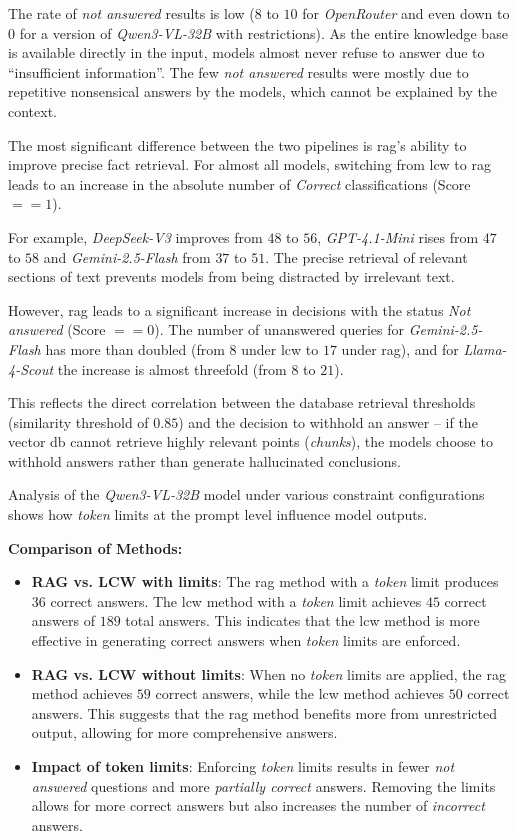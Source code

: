 The rate of \textit{not answered} results is low ($8$ to $10$ for \textit{OpenRouter} and even down to $0$ for a version of \textit{Qwen3-VL-32B} with restrictions).
As the entire knowledge base is available directly in the input, models almost never refuse to answer due to \enquote{insufficient information}.
The few \textit{not answered} results were mostly due to repetitive nonsensical answers by the models, which cannot be explained by the context.

The most significant difference between the two pipelines is \ac{rag}'s ability to improve precise fact retrieval.
For almost all models, switching from \ac{lcw} to \ac{rag} leads to an increase in the absolute number of \textit{Correct} classifications (Score $== 1$).

For example, \textit{DeepSeek-V3} improves from $48$ to $56$, \textit{GPT-4.1-Mini} rises from $47$ to $58$ and \textit{Gemini-2.5-Flash} from $37$ to $51$.
The precise retrieval of relevant sections of text prevents models from being distracted by irrelevant text.

However, \ac{rag} leads to a significant increase in decisions with the status \textit{Not answered} (Score $== 0$).
The number of unanswered queries for \textit{Gemini-2.5-Flash} has more than doubled (from $8$ under \ac{lcw} to $17$ under \ac{rag}), and for \textit{Llama-4-Scout} the increase is almost threefold (from $8$ to $21$).

This reflects the direct correlation between the database retrieval thresholds (similarity threshold of $0.85$) and the decision to withhold an answer -- if the vector \ac{db} cannot retrieve highly relevant points (\textit{chunks}), the models choose to withhold answers rather than generate hallucinated conclusions.

Analysis of the \textit{Qwen3-VL-32B} model under various constraint configurations shows how \textit{token} limits at the prompt level influence model outputs.

\noindent\textbf{Comparison of Methods:}
\begin{itemize}
    \item \textbf{RAG vs. LCW with limits}: The \ac{rag} method with a \textit{token} limit produces $36$ correct answers.
    The \ac{lcw} method with a \textit{token} limit achieves $45$ correct answers of $189$ total answers.
    This indicates that the \ac{lcw} method is more effective in generating correct answers when \textit{token} limits are enforced.
    \item \textbf{RAG vs. LCW without limits}: When no \textit{token} limits are applied, the \ac{rag} method achieves $59$ correct answers, while the \ac{lcw} method achieves $50$ correct answers.
    This suggests that the \ac{rag} method benefits more from unrestricted output, allowing for more comprehensive answers.
    \item \textbf{Impact of token limits}: Enforcing \textit{token} limits results in fewer \textit{not answered} questions and more \textit{partially correct} answers.
    Removing the limits allows for more correct answers but also increases the number of \textit{incorrect} answers.
\end{itemize}



